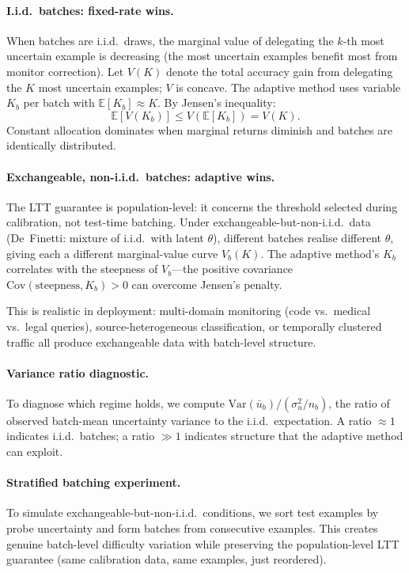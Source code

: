 \documentclass{article}
\begin{document}
\paragraph{I.i.d.\ batches: fixed-rate wins.}
When batches are i.i.d.\ draws, the marginal value of delegating the $k$-th most uncertain example is decreasing (the most uncertain examples benefit most from monitor correction).
Let $V(K)$ denote the total accuracy gain from delegating the $K$ most uncertain examples; $V$ is concave. The adaptive method uses variable $K_b$ per batch with $\mathbb{E}[K_b] \approx K$. By Jensen's inequality:
\begin{equation}
    \label{eq:jensen}
    \mathbb{E}[V(K_b)] \leq V(\mathbb{E}[K_b]) = V(K).
\end{equation}
Constant allocation dominates when marginal returns diminish and batches are identically distributed.

\paragraph{Exchangeable, non-i.i.d.\ batches: adaptive wins.}
The LTT guarantee is population-level: it concerns the threshold selected during calibration, not test-time batching.
Under exchangeable-but-non-i.i.d.\ data (De~Finetti: mixture of i.i.d.\ with latent $\theta$), different batches realise different $\theta$, giving each a different marginal-value curve $V_b(K)$. The adaptive method's $K_b$ correlates with the steepness of $V_b$---the positive covariance $\text{Cov}(\text{steepness}, K_b) > 0$ can overcome Jensen's penalty.

This is realistic in deployment: multi-domain monitoring (code vs.\ medical vs.\ legal queries), source-heterogeneous classification, or temporally clustered traffic all produce exchangeable data with batch-level structure.

\paragraph{Variance ratio diagnostic.}
To diagnose which regime holds, we compute $\text{Var}(\bar{u}_b) / (\sigma^2_u / n_b)$, the ratio of observed batch-mean uncertainty variance to the i.i.d.\ expectation.
A ratio $\approx 1$ indicates i.i.d.\ batches; a ratio $\gg 1$ indicates structure that the adaptive method can exploit.

\paragraph{Stratified batching experiment.}
To simulate exchangeable-but-non-i.i.d.\ conditions, we sort test examples by probe uncertainty and form batches from consecutive examples. This creates genuine batch-level difficulty variation while preserving the population-level LTT guarantee (same calibration data, same examples, just reordered).
\end{document}
